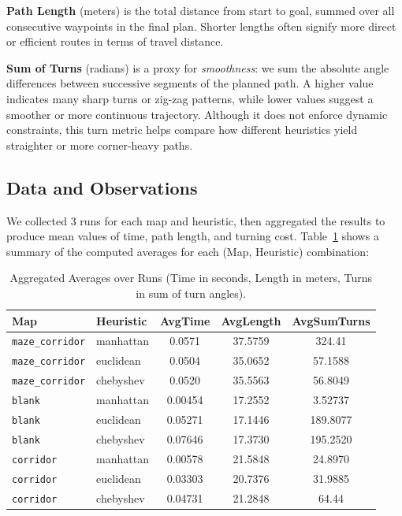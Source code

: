 \documentclass[letterpaper, 10 pt, conference]{ieeeconf}
\begin{document}
\textbf{Path Length} (meters) is the total distance from start to goal, summed over all consecutive waypoints in the final plan. Shorter lengths often signify more direct or efficient routes in terms of travel distance.

\textbf{Sum of Turns} (radians) is a proxy for \textit{smoothness}: we sum the absolute angle differences between successive segments of the planned path. A higher value indicates many sharp turns or zig-zag patterns, while lower values suggest a smoother or more continuous trajectory. Although it does not enforce dynamic constraints, this turn metric helps compare how different heuristics yield straighter or more corner-heavy paths.


\subsection{Data and Observations}
We collected 3 runs for each map and heuristic, then aggregated the results to produce mean values of time, path length, and turning cost. Table~\ref{table:aggregated} shows a summary of the computed averages for each (Map, Heuristic) combination:

\begin{table}[!ht]
\centering
\footnotesize
\caption{Aggregated Averages over Runs (Time in seconds, Length in meters, Turns in sum of turn angles).}
\label{table:aggregated}
\begin{tabular}{|l|l|c|c|c|}
\hline
\textbf{Map} & \textbf{Heuristic} & \textbf{AvgTime} & \textbf{AvgLength} & \textbf{AvgSumTurns} \\
\hline
\texttt{maze\_corridor} & manhattan & 0.0571 & 37.5759 & 324.41 \\
\texttt{maze\_corridor} & euclidean & 0.0504 & 35.0652 & 57.1588 \\
\texttt{maze\_corridor} & chebyshev & 0.0520 & 35.5563 & 56.8049 \\
\hline
\texttt{blank} & manhattan & 0.00454 & 17.2552 & 3.52737 \\
\texttt{blank} & euclidean & 0.05271 & 17.1446 & 189.8077 \\
\texttt{blank} & chebyshev & 0.07646 & 17.3730 & 195.2520 \\
\hline
\texttt{corridor} & manhattan & 0.00578 & 21.5848 & 24.8970 \\
\texttt{corridor} & euclidean & 0.03303 & 20.7376 & 31.9885 \\
\texttt{corridor} & chebyshev & 0.04731 & 21.2848 & 64.44 \\
\hline
\end{tabular}
\end{table}
\end{document}
